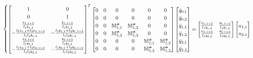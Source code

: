 \begin{itemize}
\begin{equation}
	\begin{cases}
	\begin{bmatrix}
	1 & 0 \\
	0 & 1 \\
	\frac{\mathsf{c}_{1,1+2}}{l_1 \mathsf{s}_{1,2}} &  \frac{\mathsf{s}_{1,1+2}}{l_1 \mathsf{s}_{1,2}} \\
	-\frac{l_1 \mathsf{c}_{1,1} + l_2 \mathsf{c}_{1,1+2}}{l_1 l_2 \mathsf{s}_{1,2}} &  -\frac{l_1 \mathsf{s}_{1,1} + l_2 \mathsf{s}_{1,1+2}}{l_1 l_2 \mathsf{s}_{1,2}} \\
	\frac{\mathsf{c}_{2,1+2}}{l_1 \mathsf{s}_{2,2}} &  \frac{\mathsf{s}_{2,1+2}}{l_1 \mathsf{s}_{2,2}} \\
	-\frac{l_1 \mathsf{c}_{2,1} + l_2 \mathsf{c}_{2,1+2}}{l_1 l_2 \mathsf{s}_{2,2}} &  -\frac{l_1 \mathsf{s}_{2,1} + l_2 \mathsf{s}_{2,1+2}}{l_1 l_2 \mathsf{s}_{2,2}} \\
	\end{bmatrix}^T
	\begin{bmatrix}
	0 & 0 & 0 & 0 & 0 & 0 \\
	0 & 0 & 0 & 0 & 0 & 0 \\
	0 & 0 & \mathbb{M}^{\scriptscriptstyle \#}_{1,1} & \mathbb{M}^{\scriptscriptstyle \#}_{1,2} & 0 & 0  \\
	0 & 0 & \mathbb{M}^{\scriptscriptstyle \#}_{1,2} & \mathbb{M}^{\scriptscriptstyle \#}_{1,2} & 0 & 0 \\
	0 & 0 & 0 & 0 & \mathbb{M}^{\scriptscriptstyle \#}_{1,1} & \mathbb{M}^{\scriptscriptstyle \#}_{1,2}   \\
	0 & 0 & 0 & 0 & \mathbb{M}^{\scriptscriptstyle \#}_{1,2} & \mathbb{M}^{\scriptscriptstyle \#}_{1,2}  \\
	\end{bmatrix}
	\begin{bmatrix}
	\ddot{q}_{0,1} \\
	\ddot{q}_{0,2} \\
	\ddot{q}_{1,1} \\
	\ddot{q}_{1,2} \\
	\ddot{q}_{2,1} \\
	\ddot{q}_{2,2} \\
	\end{bmatrix}
	=
	\begin{bmatrix}
	\frac{\mathsf{c}_{1,1+2}}{l_1 \mathsf{s}_{1,2}} &  \frac{\mathsf{s}_{1,1+2}}{l_1 \mathsf{s}_{1,2}} \\
	\frac{\mathsf{c}_{2,1+2}}{l_1 \mathsf{s}_{2,2}} &  \frac{\mathsf{s}_{2,1+2}}{l_1 \mathsf{s}_{2,2}} \\
	\end{bmatrix}
	\begin{bmatrix}
	u_{1,1} \\
	u_{2,1} \\
	\end{bmatrix} \\

\end{cases}
\end{equation}
\end{itemize}
